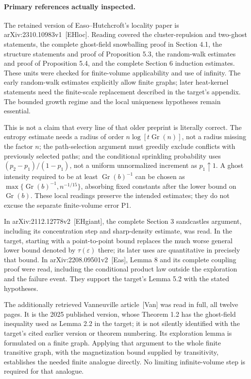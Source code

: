 \documentclass[10pt]{article}
\begin{document}
\paragraph*{Primary references actually inspected.}\mbox{}\par
The retained version of Easo–Hutchcroft’s locality paper is arXiv:2310.10983v1 [EHloc]. Reading covered the cluster-repulsion and two-ghost statements, the complete ghost-field snowballing proof in Section 4.1, the structure statements and proof of Proposition 5.3, the random-walk estimates and proof of Proposition 5.4, and the complete Section 6 induction estimates. These units were checked for finite-volume applicability and use of infinity. The early random-walk estimates explicitly allow finite graphs; later heat-kernel statements need the finite-scale replacement described in the target’s appendix. The bounded growth regime and the local uniqueness hypotheses remain essential.\par
This is not a claim that every line of that older preprint is literally correct. The entropy estimate needs a radius of order \(n\log[t\operatorname{Gr}(n)]\), not a radius missing the factor \(n\); the path-selection argument must greedily exclude conflicts with previously selected paths; and the conditional sprinkling probability uses \((p_2-p_1)/(1-p_1)\), not a uniform unnormalized increment as \(p_1\uparrow1\). A ghost intensity required to be at least \(\operatorname{Gr}(b)^{-1}\) can be chosen as \(\max\{\operatorname{Gr}(b)^{-1},n^{-1/15}\}\), absorbing fixed constants after the lower bound on \(\operatorname{Gr}(b)\). These local readings preserve the intended estimates; they do not excuse the separate finite-volume error P1.\par
In arXiv:2112.12778v2 [EHgiant], the complete Section 3 sandcastles argument, including its concentration step and sharp-density estimate, was read. In the target, starting with a point-to-point bound replaces the much worse general lower bound denoted by \(\tau(\varepsilon)\) there; its later uses are quantitative in precisely that bound. In arXiv:2208.09501v2 [Eas], Lemma 8 and its complete coupling proof were read, including the conditional product law outside the exploration and the failure event. They support the target’s Lemma 5.2 with the stated hypotheses.\par
The additionally retrieved Vanneuville article [Van] was read in full, all twelve pages. It is the 2025 published version, whose Theorem 1.2 has the ghost-field inequality used as Lemma 2.2 in the target; it is not silently identified with the target’s cited earlier version or theorem numbering. Its exploration lemma is formulated on a finite graph. Applying that argument to the whole finite transitive graph, with the magnetization bound supplied by transitivity, establishes the needed finite analogue directly. No limiting infinite-volume step is required for that analogue.\par
\end{document}
